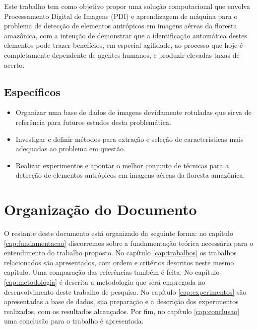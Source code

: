 Este trabalho tem como objetivo propor uma solução computacional que envolva Processamento Digital de Imagens (PDI) e aprendizagem de máquina para o problema de detecção de elementos antrópicos em imagens aéreas da floresta amazônica, com a intenção de demonstrar que a identificação automática destes elementos pode trazer benefícios, em especial agilidade, ao processo que hoje é completamente dependente de agentes humanos, e produzir elevadas taxas de acerto.

\subsection{Específicos}

\begin{itemize}
    \item Organizar uma base de dados de imagens devidamente rotuladas que sirva de referência para futuros estudos desta problemática.
    \item Investigar e definir métodos para extração e seleção de características mais adequadas ao problema em questão.
    \item Realizar experimentos e apontar o melhor conjunto de técnicas para a detecção de elementos antrópicos em imagens aéreas da floresta amazônica.
\end{itemize}

\section{Organização do Documento}

O restante deste documento está organizado da seguinte forma: no capítulo \ref{cap:fundamentacao} discorremos sobre a fundamentação teórica necessária para o entendimento do trabalho proposto. No capítulo \ref{cap:trabalhos} os trabalhos relacionados são apresentados, com ordem e critérios descritos neste mesmo capítulo. Uma comparação das referências também é feita. No capítulo \ref{cap:metodologia} é descrita a metodologia que será empregada no desenvolvimento deste trabalho de pesquisa. No capítulo \ref{cap:experimentos} são apresentadas a base de dados, sua preparação e a descrição dos experimentos realizados, com os resultados alcançados. Por fim, no capítulo \ref{cap:conclusao} uma conclusão para o trabalho é apresentada.
